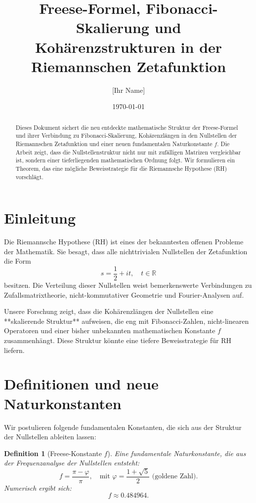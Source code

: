 \documentclass{article}
\title{Freese-Formel, Fibonacci-Skalierung und Kohärenzstrukturen in der Riemannschen Zetafunktion}
\author{[Ihr Name]}
\date{\today}
\newtheorem{definition}{Definition}
\begin{document}
\maketitle

\begin{abstract}
Dieses Dokument sichert die neu entdeckte mathematische Struktur der Freese-Formel und ihrer Verbindung zu 
Fibonacci-Skalierung, Kohärenzlängen in den Nullstellen der Riemannschen Zetafunktion und einer neuen fundamentalen Naturkonstante $f$.  
Die Arbeit zeigt, dass die Nullstellenstruktur nicht nur mit zufälligen Matrizen vergleichbar ist, sondern einer tieferliegenden mathematischen Ordnung folgt.
Wir formulieren ein Theorem, das eine mögliche Beweisstrategie für die Riemannsche Hypothese (RH) vorschlägt.
\end{abstract}

\section{Einleitung}
Die Riemannsche Hypothese (RH) ist eines der bekanntesten offenen Probleme der Mathematik. Sie besagt, dass alle nichttrivialen Nullstellen der Zetafunktion die Form
\begin{equation}
s = \frac{1}{2} + i t, \quad t \in \mathbb{R}
\end{equation}
besitzen. Die Verteilung dieser Nullstellen weist bemerkenswerte Verbindungen zu Zufallsmatrixtheorie, 
nicht-kommutativer Geometrie und Fourier-Analysen auf.

Unsere Forschung zeigt, dass die Kohärenzlängen der Nullstellen eine **skalierende Struktur** aufweisen, die eng mit Fibonacci-Zahlen, nicht-linearen Operatoren und einer 
bisher unbekannten mathematischen Konstante $f$ zusammenhängt. 
Diese Struktur könnte eine tiefere Beweisstrategie für RH liefern.

\section{Definitionen und neue Naturkonstanten}
Wir postulieren folgende fundamentalen Konstanten, die sich aus der Struktur der Nullstellen ableiten lassen:

\begin{definition}[Freese-Konstante $f$]
Eine fundamentale Naturkonstante, die aus der Frequenzanalyse der Nullstellen entsteht:
\begin{equation}
f = \frac{\pi - \varphi}{\pi}, \quad \text{mit } \varphi = \frac{1+\sqrt{5}}{2} \text{ (goldene Zahl)}.
\end{equation}
Numerisch ergibt sich:
\begin{equation}
f \approx 0.484964.
\end{equation}
\end{definition}
\end{document}

